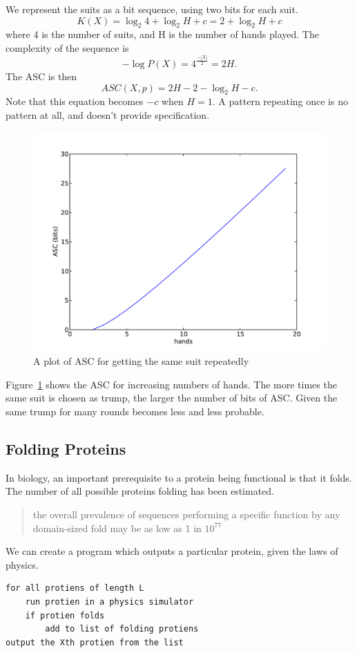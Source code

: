 We represent the suits as a bit sequence, using two bits for each suit.
\begin{equation}
    K(X) = \log_2 4 + \log_2 H + c = 2 + \log_2 H + c
\end{equation} where 4 is the number of suits, and H is the number of hands played.
The complexity of the sequence is 
\begin{equation}
    -\log P(X) = 4^\frac{-|X|}{2} = 2H \mbox{.}
\end{equation}
The ASC is then
\begin{equation}
    ASC(X,p) = 2H - 2 - \log_2 H - c \mbox{.}
\end{equation}
Note that this equation becomes $-c$ when $H=1$.
A pattern repeating once is no pattern at all, and doesn't provide specification.
\begin{figure}
    \includegraphics[width=\textwidth]{EwertRepeat}
    \caption{A plot of ASC for getting the same suit repeatedly}
    \label{suit.plot}
\end{figure}
Figure~\ref{suit.plot} shows the ASC for increasing numbers of hands.
The more times the same suit is chosen as trump, the larger the number of bits of ASC.
Given the same trump for many rounds becomes less and less probable.

\subsection{Folding Proteins}
\label{sec_folding}

In biology, an important prerequisite to a protein being functional is that it folds.
The number of all possible proteins folding has been estimated.
\begin{quotation}
    the overall prevalence of sequences performing a specific function by any domain-sized fold may be as low as 1 in $10^{77}$ \cite{axe2004}
\end{quotation}
We can create a program which outputs a particular protein, given the laws of physics.
\begin{verbatim}
for all protiens of length L
    run protien in a physics simulator
    if protien folds
        add to list of folding protiens
output the Xth protien from the list
\end{verbatim}


